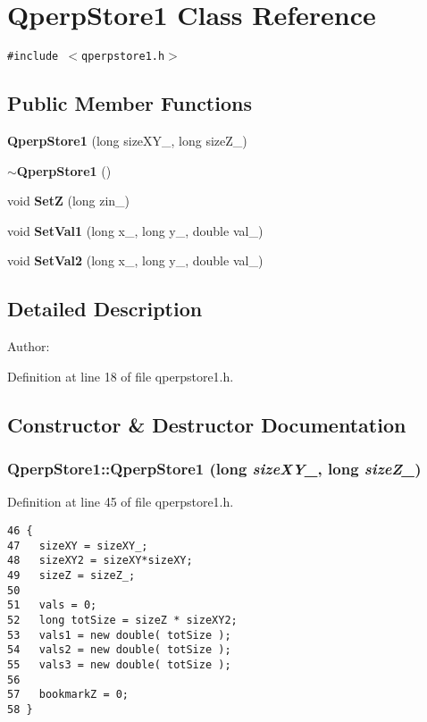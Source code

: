 \section{QperpStore1 Class Reference}
\label{classQperpStore1}
{\tt \#include $<$qperpstore1.h$>$}

\subsection*{Public Member Functions}
\begin{CompactItemize}
\item 
{\bf QperpStore1} (long sizeXY\_\-, long sizeZ\_\-)
\item 
{\bf $\sim$QperpStore1} ()
\item 
void {\bf SetZ} (long zin\_\-)
\item 
void {\bf SetVal1} (long x\_\-, long y\_\-, double val\_\-)
\item 
void {\bf SetVal2} (long x\_\-, long y\_\-, double val\_\-)
\end{CompactItemize}


\subsection{Detailed Description}
\begin{Desc}
\item[Author:]\end{Desc}


Definition at line 18 of file qperpstore1.h.

\subsection{Constructor \& Destructor Documentation}
\subsubsection{\setlength{\rightskip}{0pt plus 5cm}QperpStore1::QperpStore1 (long {\em sizeXY\_\-}, long {\em sizeZ\_\-})}\label{classQperpStore1_c9a22f6c039b059e62c87c35c85451dd}




Definition at line 45 of file qperpstore1.h.

\begin{Code}\begin{verbatim}46 {
47   sizeXY = sizeXY_; 
48   sizeXY2 = sizeXY*sizeXY;
49   sizeZ = sizeZ_;
50 
51   vals = 0;
52   long totSize = sizeZ * sizeXY2;
53   vals1 = new double( totSize );
54   vals2 = new double( totSize );
55   vals3 = new double( totSize );
56 
57   bookmarkZ = 0;
58 }
\end{verbatim}
\end{Code}



